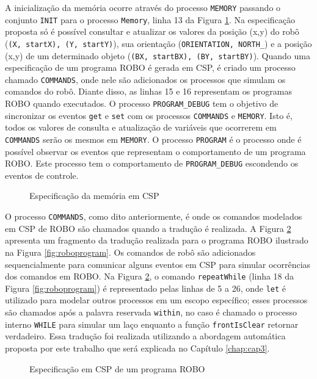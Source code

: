 A inicialização da memória ocorre através do processo \texttt{MEMORY} passando o conjunto \texttt{INIT} para o processo \texttt{Memory}, linha 13 da Figura \ref{fig:model}. Na especificação proposta só é possível consultar e atualizar os valores da posição (x,y) do robô (\texttt{(X, startX), (Y, startY)}), sua orientação (\texttt{ORIENTATION, NORTH\_}) e a posição (x,y) de um determinado objeto (\texttt{(BX, startBX), (BY, startBY)}). Quando uma especificação de um programa ROBO é gerada em CSP, é criado um processo chamado \texttt{COMMANDS}, onde nele são adicionados os processos que simulam os comandos do robô. Diante disso, as linhas 15 e 16 representam os programas ROBO quando executados. O processo \texttt{PROGRAM\_DEBUG} tem o objetivo de sincronizar os eventos \texttt{get} e \texttt{set} com os processos \texttt{COMMANDS} e \texttt{MEMORY}. Isto é, todos os valores de consulta e atualização de variáveis que ocorrerem em \texttt{COMMANDS} serão os mesmos em \texttt{MEMORY}. O processo \texttt{PROGRAM} é o processo onde é possível observar os eventos que representam o comportamento de um programa ROBO. Este processo tem o comportamento de \texttt{PROGRAM\_DEBUG} escondendo os eventos de controle.

\begin{figure}[h]
\caption{Especificação da memória em CSP}

\label{fig:model}
\end{figure}
O processo \texttt{COMMANDS}, como dito anteriormente, é onde os comandos modelados em CSP de ROBO são chamados quando a tradução é realizada. A Figura \ref{fig:programcsp} apresenta um fragmento da tradução realizada para o programa ROBO ilustrado na Figura \ref{fig:roboprogram}. Os comandos de robô são adicionados sequencialmente para comunicar alguns eventos em CSP para simular ocorrências dos comandos em ROBO. Na Figura \ref{fig:programcsp}, o comando \texttt{repeatWhile} (linha 18 da Figura \ref{fig:roboprogram}) é representado pelas linhas de 5 a 26, onde \texttt{let} é utilizado para modelar outros processos em um escopo específico; esses processos são chamados após a palavra reservada \texttt{within}, no caso é chamado o processo interno \texttt{WHILE} para simular um laço enquanto a função \texttt{frontIsClear} retornar verdadeiro. Essa tradução foi realizada utilizando a abordagem automática proposta por este trabalho que será explicada no Capítulo \ref{chap:cap3}.

\begin{figure}[h]
\caption{Especificação em CSP de um programa ROBO}

\label{fig:programcsp}
\end{figure}

